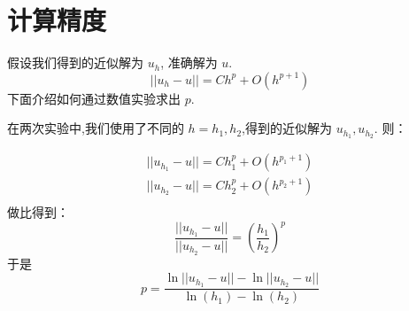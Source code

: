 \documentclass{book}
\begin{document}
\section{计算精度}
假设我们得到的近似解为 $u_h$, 准确解为 $u$.
\begin{equation}
    || u_h-u || = Ch^p + O(h^{p+1})
\end{equation}
下面介绍如何通过数值实验求出 $p$.

在两次实验中,我们使用了不同的 $h=h_1,h_2$,得到的近似解为 $u_{h_1},u_{h_2}$. 则：

\begin{equation}
    \begin{aligned}
        || u_{h_1}-u || = Ch_1^p + O(h^{p_1+1}) \\
        || u_{h_2}-u || = Ch_2^p + O(h^{p_2+1}) \\
    \end{aligned}
\end{equation}
做比得到：
\begin{equation}
    \frac{|| u_{h_1}-u ||}{|| u_{h_2}-u ||} = \left(\frac{h_1}{h_2}\right)^p
\end{equation}
于是
\begin{equation}
    p = \frac{\ln|| u_{h_1}-u ||-\ln|| u_{h_2}-u ||}{\ln(h_1)-\ln(h_2)}
\end{equation}
\end{document}
